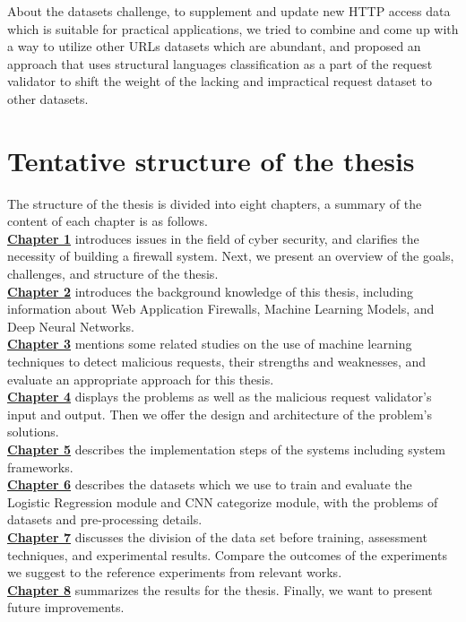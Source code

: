 About the datasets challenge, to supplement and update new HTTP access data which is suitable for practical applications, we tried to combine and come up with a way to utilize other URLs datasets which are abundant, and proposed an approach that uses structural languages classification as a part of the request validator to shift the weight of the lacking and impractical request dataset to other datasets.
\newpage
\section{Tentative structure of the thesis}
\label{sec:structure}
	\newcommand\nextintro{\\[4mm]}
	\hspace{0.5cm}The structure of the thesis is divided into eight chapters, a summary of the content of each chapter is as follows. \nextintro
	\hyperref[chap:introduction]{\textbf{Chapter 1}} introduces issues in the field of cyber security, and clarifies the necessity of building a firewall system. Next, we present an overview of the goals, challenges, and structure of the thesis.\nextintro
	\hyperref[chap:background]{\textbf{Chapter 2}} introduces the background knowledge of this thesis, including information about Web Application Firewalls, Machine Learning Models, and Deep Neural Networks.\nextintro
	\hyperref[chap:literaturereview]{\textbf{Chapter 3}} mentions some related studies on the use of machine learning techniques to detect malicious requests, their strengths and weaknesses, and evaluate an appropriate approach for this thesis.\nextintro
	\hyperref[chap:proposed_approaches]{\textbf{Chapter 4}} displays the problems as well as the malicious request validator's input and output. Then we offer the design and architecture of the problem's solutions.\nextintro
	\hyperref[chap:implementation]{\textbf{Chapter 5}} describes the implementation steps of the systems including system frameworks.\nextintro
	\hyperref[chap:dataset]{\textbf{Chapter 6}} describes the datasets which we use to train and evaluate the Logistic Regression module and CNN categorize module, with the problems of datasets and pre-processing details.\nextintro 
	\hyperref[chap:experiments]{\textbf{Chapter 7}} discusses the division of the data set before training, assessment techniques, and experimental results. Compare the outcomes of the experiments we suggest to the reference experiments from relevant works.\nextintro
	\hyperref[chap:conclusion]{\textbf{Chapter 8}} summarizes the results for the thesis. Finally, we want to present future improvements.\nextintro
